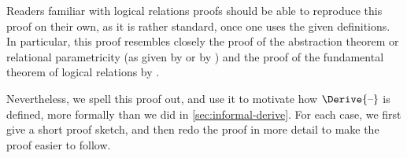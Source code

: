 Readers familiar with logical relations proofs should be able to reproduce this
proof on their own, as it is rather standard, once one uses the given
definitions. In particular, this proof resembles closely the proof of the
abstraction theorem or relational parametricity (as given by
\citet[Sec.~6]{Wadler1989theorems} or by \citet[Sec.~3.3,
Theorem~3]{Bernardy2011realizability}) and the proof of the fundamental theorem
of logical relations by \citet{Statman1985logical}.

Nevertheless, we spell this proof out, and use it to motivate how
\ensuremath{\Derive{\text{\textendash}}} is defined, more formally than we did in
\cref{sec:informal-derive}. For each case, we first give a short proof sketch,
and then redo the proof in more detail to make the proof easier to follow.

\deriveCorrect*
